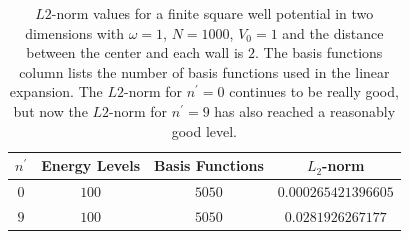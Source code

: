 \documentclass[../main.tex]{subfiles}
\begin{document}
\begin{table}[!ht]
  \centering
  \begin{tabular}{ | c | c | c | c | }
    \hline
    $n^\prime$ & Energy Levels & Basis Functions & $L_2$-norm\\*
    \hline
    $0$ & $100$ & $5050$ & $0.000265421396605$
    \\*
    \hline
    $9$ & $100$ & $5050$ & $0.0281926267177$
    \\*
    \hline
  \end{tabular}
  \caption{$L2$-norm values for a finite square well potential in two dimensions with $\omega = 1$, $N = 1000$, $V_0 = 1$ and the distance between the center and each wall is $2$. The basis functions column lists the number of basis functions used in the linear expansion. The $L2$-norm for $n^\prime = 0$ continues to be really good, but now the $L2$-norm for $n^\prime = 9$ has also reached a reasonably good level.}
  \label{tab:L2-norm Square100}
\end{table}
\end{document}
